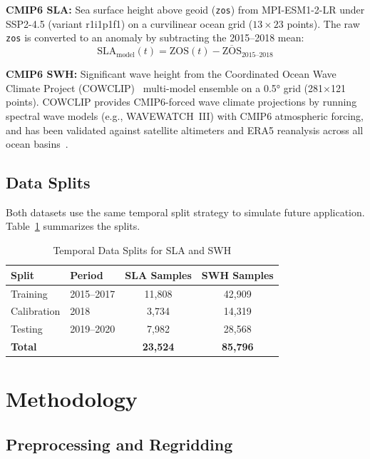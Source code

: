 \documentclass[conference]{IEEEtran}
\begin{document}
\textbf{CMIP6 SLA:} Sea surface height above geoid (\texttt{zos}) from MPI-ESM1-2-LR under SSP2-4.5 (variant r1i1p1f1) on a curvilinear ocean grid ($13 \times 23$ points). The raw \texttt{zos} is converted to an anomaly by subtracting the 2015--2018 mean:
\begin{equation}
    \text{SLA}_{\text{model}}(t) = \text{ZOS}(t) - \overline{\text{ZOS}}_{2015\text{--}2018}
\end{equation}

\textbf{CMIP6 SWH:} Significant wave height from the Coordinated Ocean Wave Climate Project (COWCLIP)~\cite{cowclip2023} multi-model ensemble on a 0.5° grid (281$\times$121 points). COWCLIP provides CMIP6-forced wave climate projections by running spectral wave models (e.g., WAVEWATCH~III) with CMIP6 atmospheric forcing, and has been validated against satellite altimeters and ERA5 reanalysis across all ocean basins~\cite{morim2024}.

\subsection{Data Splits}

Both datasets use the same temporal split strategy to simulate future application. Table~\ref{tab:splits} summarizes the splits.

\begin{table}[H]
\centering
\caption{Temporal Data Splits for SLA and SWH}
\label{tab:splits}
\begin{tabular}{@{}llcc@{}}
\toprule
\textbf{Split} & \textbf{Period} & \textbf{SLA Samples} & \textbf{SWH Samples} \\
\midrule
Training & 2015--2017 & 11,808 & 42,909 \\
Calibration & 2018 & 3,734 & 14,319 \\
Testing & 2019--2020 & 7,982 & 28,568 \\
\midrule
\textbf{Total} & & \textbf{23,524} & \textbf{85,796} \\
\bottomrule
\end{tabular}
\end{table}

\section{Methodology}

\subsection{Preprocessing and Regridding}
\end{document}
